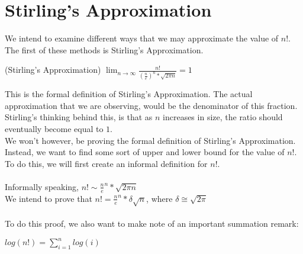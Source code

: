 \section{Stirling's Approximation}
We intend to examine different ways that we may approximate the value of $n!$. The first of these methods is Stirling's Approximation.\\
\begin{theorem}
    (Stirling's Approximation) $\lim_{n\to\infty} \frac{n!}{(\frac{n}{e})^n * \sqrt{2\pi n}} = 1$
\end{theorem}
This is the formal definition of Stirling's Approximation. The actual approximation that we are observing, would be the denominator of this fraction. Stirling's thinking behind this, is that as $n$ increases in size, the ratio should eventually become equal to $1$.\\
We won't however, be proving the formal definition of Stirling's Approximation. Instead, we want to find some sort of upper and lower bound for the value of $n!$. To do this, we will first create an informal definition for $n!$.\\
\\
Informally speaking, $n! \sim \frac n e ^n * \sqrt{2\pi n}$\\
We intend to prove that $n! = \frac n e ^n * \delta \sqrt{n}$, where $\delta \cong \sqrt{2\pi}$\\
\\
To do this proof, we also want to make note of an important summation remark:
\begin{remark}
    $log(n!) = \sum_{i=1}^{n} {log(i)}$\\
\end{remark}

